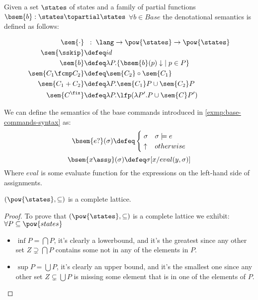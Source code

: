 \begin{definition}
  \label{def:deno}
  Given a set $\states$ of states and a family of partial functions 
  $\bsem{b} : \states \topartial \states$ $\forall b \in Base$ the denotational 
  semantics is defined as follows:

  \begin{align*}
      \sem{\cdot}         & \;\;:\; \lang \to \pow{\states} \to \pow{\states} \\
      \sem{\sskip}        &\defeq id \\
      \sem{b}             &\defeq \lambda P . \{ \bsem{b}(p)\downarrow \; \mid 
        p \in P \} \\
      \sem{C_1 \fcmp C_2} &\defeq \sem{C_2} \circ \sem{C_1} \\
      \sem{C_1 + C_2}     &\defeq \lambda P . \sem{C_1} P \cup \sem{C_2} P \\
      \sem{C^\fix}        &\defeq \lambda P . \lfp(\lambda P'. P \cup \sem{C} P')
  \end{align*}

  \begin{example}
    We can define the semantics of the base commands introduced in 
    \ref{exmp:base-commands-syntax} as:
    $$\bsem{e ?}(\sigma) \defeq \begin{cases}
      \; \sigma & \sigma \models e \\
      \; \uparrow & otherwise
    \end{cases}$$
    $$\bsem{x \ass y}(\sigma) \defeq \sigma[x/eval(y, \sigma)]$$
    Where $eval$ is some evaluate function for the expressions on the left-hand
    side of assignments.
  \end{example}

  \begin{theorem}
    \label{thm:sem-lattice}
    $(\pow{\states}, \subseteq)$ is a complete lattice.
  \end{theorem}
  \begin{proof}
    To prove that $(\pow{\states}, \subseteq)$ is a complete lattice we exhibit:
    $\forall P \subseteq \pow{states}$
    \begin{itemize}
      \item $\inf P = \bigcap P$, it's clearly a lowerbound, and it's the 
        greatest since any other set $Z \supsetneq \bigcap P$ contains some
        not in any of the elements in $P$.
      \item $\sup P = \bigcup P$, it's clearly an upper bound, and it's the
        smallest one since any other set $Z \subsetneq \bigcup P$ is missing
        some element that is in one of the elements of $P$.
    \end{itemize}
  \end{proof}


\end{definition}
